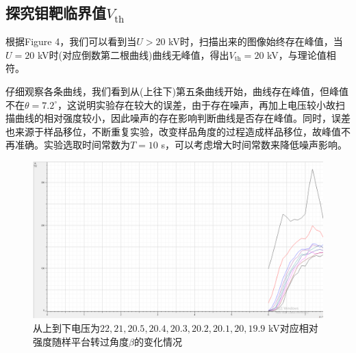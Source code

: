 \documentclass[10.5pt]{article}
\renewcommand{\=}[1]{\stackrel{#1}{=}} %
\theoremstyle{definition}
\theoremstyle{remark}
\begin{document}
	\subsection{探究钼靶临界值$V_{\text{th}}$}
	根据Figure 4，我们可以看到当$U>20$ kV时，扫描出来的图像始终存在峰值，当$U=20$ kV时(对应倒数第二根曲线)曲线无峰值，得出$V_{\text{th}}=20$ kV，与理论值相符。
	
	仔细观察各条曲线，我们看到从(上往下)第五条曲线开始，曲线存在峰值，但峰值不在$\theta=7.2^\circ$，这说明实验存在较大的误差，由于存在噪声，再加上电压较小故扫描曲线的相对强度较小，因此噪声的存在影响判断曲线是否存在峰值。同时，误差也来源于样品移位，不断重复实验，改变样品角度的过程造成样品移位，故峰值不再准确。实验选取时间常数为$T=10$ s，可以考虑增大时间常数来降低噪声影响。
	\begin{figure}[H]
		\centering
		\includegraphics[scale=0.4]{vth.png}
		\captionsetup{font=footnotesize}
		\caption{从上到下电压为$22,21,20.5,20.4,20.3,20.2,20.1,20,19.9$ kV对应相对强度随样平台转过角度$\beta$的变化情况}
	\end{figure}
\end{document}
